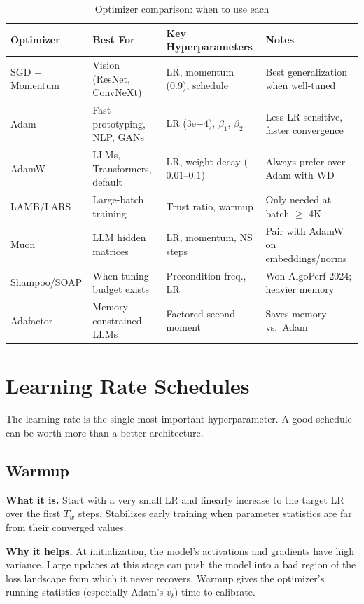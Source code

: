 \begin{table}[H]
\centering
\caption{Optimizer comparison: when to use each}
\begin{tabularx}{\textwidth}{lXXX}
\toprule
\textbf{Optimizer} & \textbf{Best For} & \textbf{Key Hyperparameters} & \textbf{Notes} \\
\midrule
SGD + Momentum & Vision (ResNet, ConvNeXt) & LR, momentum (0.9), schedule & Best generalization when well-tuned \\
Adam & Fast prototyping, NLP, GANs & LR ($3\mathrm{e}{-4}$), $\beta_1$, $\beta_2$ & Less LR-sensitive, faster convergence \\
AdamW & LLMs, Transformers, default & LR, weight decay ($0.01$--$0.1$) & Always prefer over Adam with WD \\
LAMB/LARS & Large-batch training & Trust ratio, warmup & Only needed at batch $\geq$ 4K \\
Muon & LLM hidden matrices & LR, momentum, NS steps & Pair with AdamW on embeddings/norms \\
Shampoo/SOAP & When tuning budget exists & Precondition freq., LR & Won AlgoPerf 2024; heavier memory \\
Adafactor & Memory-constrained LLMs & Factored second moment & Saves memory vs.\ Adam \\
\bottomrule
\end{tabularx}
\end{table}

\section{Learning Rate Schedules}
\label{sec:lr_schedules}

The learning rate is the single most important hyperparameter. A good schedule can be worth more than a better architecture.

\subsection{Warmup}

\textbf{What it is.} Start with a very small LR and linearly increase to the target LR over the first $T_w$ steps. Stabilizes early training when parameter statistics are far from their converged values.

\textbf{Why it helps.} At initialization, the model's activations and gradients have high variance. Large updates at this stage can push the model into a bad region of the loss landscape from which it never recovers. Warmup gives the optimizer's running statistics (especially Adam's $v_t$) time to calibrate.

